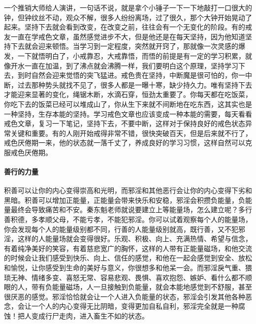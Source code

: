 一个推销大师给人演讲，一句话不说，就是拿个小锤子一下一下地敲打一口很大的钟，但钟纹丝不动，观众不解，很多人纷纷离场，过了很久，那个大钟开始晃动了起来。坚持下去就会看到改变，在改变之前，往往会有一个无变化的阶段。有的戒友一直在学戒色文章，虽然感觉进步不大，但是他还是在每天坚持，因为他知道坚持下去就会迎来顿悟。当学习到一定程度，突然就开窍了，那就像一次灵感的爆发，一下就悟明白了，小戒靠忍，大戒靠悟，而悟的前提是有一定的学习积累，就像开水一直在加温，到了沸点就会沸腾一样，我们要明白这个原理，坚持学习下去，到时自然会迎来觉悟的突飞猛进。戒色贵在坚持，中断魔是很可怕的，你一中断，过去那种势头就找不见了，很多人都是一曝十寒，缺少持久力。唯有坚持下去才能迎来显著的变化，绳锯木断，水滴石穿，恒劲太重要了。你每天都在吃饭菜，你吃下去的饭菜已经可以堆成山了，你从生下来就不间断地在吃东西，这其实也是一种坚持，生存本能的坚持。学习戒色文章也应该变成一种本能的需要，每天看看戒色文章，复习一下笔记，坚持下去，不要中断，这样对于保持良好的戒色状态异常关键和重要。有的人刚开始戒得非常不错，很快突破百天，但是后来就不行了，戒色厌倦期一来，他的状态就一落千丈了，养成良好的学习习惯，这样自然可以克服戒色厌倦期。

\paragraph{善行的力量}

积善可以让你的内心变得崇高和光明，而邪淫和其他恶行会让你的内心变得下劣和黑暗。积善可以增加正能量，正能量会带来快乐和安稳，邪淫会积攒负能量，负能量最终会导致痛苦和不安。秦东魁老师就说要建立上等能量场，怎么建立呢？多行善积德，多孝顺父母，不能亏孝，不能犯邪淫。你可以试着观察每个人的能量场，你会发现每个人的能量级别都不同，行善的人能量级别就高，既行善，又不犯邪淫，这样的人能量场就会变得很好。乐观、积极、向上、充满热情、希望与信念，有着纯净美好的笑容，有着慈悲宽广的胸怀，这样的人带有正能量磁场，和他交流的时候会让我们感受到快乐、向上、信任的感觉，和他在一起会感觉到安全、放松和愉悦，让你感受到生命的美好与意义，你很想多和他呆一会。而邪淫戾气重、猥琐无神、情绪多变、喜怒无常、容易悲观、畏惧、喜欢抱怨、嫉妒、看什么都不顺眼的人，带有负能量磁场，人一旦接触到负能量，就会本能地感觉到不舒服，甚至很厌恶的感觉。邪淫恰恰就会让一个人进入负能量的状态，邪淫会引发其他各种恶念，会让一个人的内心变得无比阴暗，变得更加自私自利，邪淫完全就是一种腐蚀！把人变成行尸走肉，进入畜生不如的状态。

